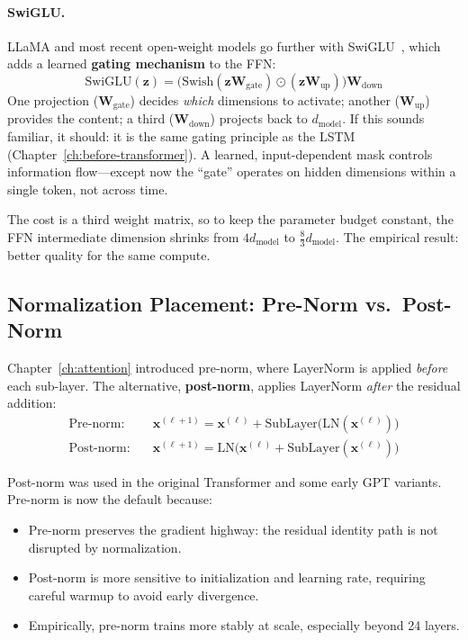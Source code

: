 \paragraph{SwiGLU.} LLaMA and most recent open-weight models go further with SwiGLU~\cite{shazeer2020glu}, which adds a learned \textbf{gating mechanism} to the FFN:
\[
  \text{SwiGLU}(\mathbf{z}) = \big(\text{Swish}(\mathbf{z}\mathbf{W}_{\text{gate}}) \odot (\mathbf{z}\mathbf{W}_{\text{up}})\big) \mathbf{W}_{\text{down}}
\]
One projection ($\mathbf{W}_{\text{gate}}$) decides \emph{which} dimensions to activate; another ($\mathbf{W}_{\text{up}}$) provides the content; a third ($\mathbf{W}_{\text{down}}$) projects back to $d_\text{model}$. If this sounds familiar, it should: it is the same gating principle as the LSTM (Chapter~\ref{ch:before-transformer}). A learned, input-dependent mask controls information flow---except now the ``gate'' operates on hidden dimensions within a single token, not across time.

The cost is a third weight matrix, so to keep the parameter budget constant, the FFN intermediate dimension shrinks from $4 d_{\text{model}}$ to $\frac{8}{3} d_{\text{model}}$. The empirical result: better quality for the same compute.

\subsection{Normalization Placement: Pre-Norm vs.\ Post-Norm}

Chapter~\ref{ch:attention} introduced pre-norm, where LayerNorm is applied \emph{before} each sub-layer. The alternative, \textbf{post-norm}, applies LayerNorm \emph{after} the residual addition:
\begin{align*}
  \text{Pre-norm:} \quad & \mathbf{x}^{(\ell+1)} = \mathbf{x}^{(\ell)} + \text{SubLayer}\!\big(\text{LN}(\mathbf{x}^{(\ell)})\big) \\
  \text{Post-norm:} \quad & \mathbf{x}^{(\ell+1)} = \text{LN}\!\big(\mathbf{x}^{(\ell)} + \text{SubLayer}(\mathbf{x}^{(\ell)})\big)
\end{align*}

Post-norm was used in the original Transformer and some early GPT variants. Pre-norm is now the default because:
\begin{itemize}[nosep]
  \item Pre-norm preserves the gradient highway: the residual identity path is not disrupted by normalization.
  \item Post-norm is more sensitive to initialization and learning rate, requiring careful warmup to avoid early divergence.
  \item Empirically, pre-norm trains more stably at scale, especially beyond 24 layers.
\end{itemize}

